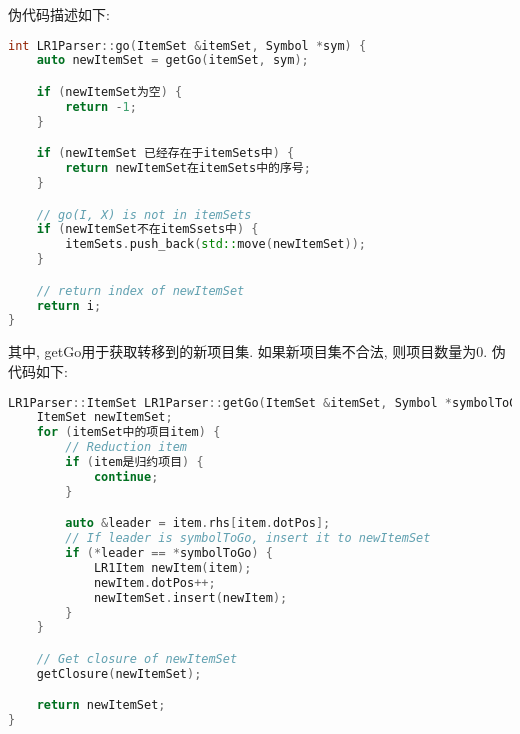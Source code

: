 伪代码描述如下:
\begin{lstlisting}[language=c++]
int LR1Parser::go(ItemSet &itemSet, Symbol *sym) {
    auto newItemSet = getGo(itemSet, sym);

    if (newItemSet为空) {
        return -1;
    }

    if (newItemSet 已经存在于itemSets中) {
        return newItemSet在itemSets中的序号;
    }

    // go(I, X) is not in itemSets
    if (newItemSet不在itemSsets中) {
        itemSets.push_back(std::move(newItemSet));
    }

    // return index of newItemSet
    return i;
}
\end{lstlisting}

其中, getGo用于获取转移到的新项目集. 如果新项目集不合法, 则项目数量为0.
伪代码如下:
\begin{lstlisting}[language=c++]
LR1Parser::ItemSet LR1Parser::getGo(ItemSet &itemSet, Symbol *symbolToGo) {
    ItemSet newItemSet;
    for (itemSet中的项目item) {
        // Reduction item
        if (item是归约项目) {
            continue;
        }

        auto &leader = item.rhs[item.dotPos];
        // If leader is symbolToGo, insert it to newItemSet
        if (*leader == *symbolToGo) {
            LR1Item newItem(item);
            newItem.dotPos++;
            newItemSet.insert(newItem);
        }
    }

    // Get closure of newItemSet
    getClosure(newItemSet);

    return newItemSet;
}
\end{lstlisting}

